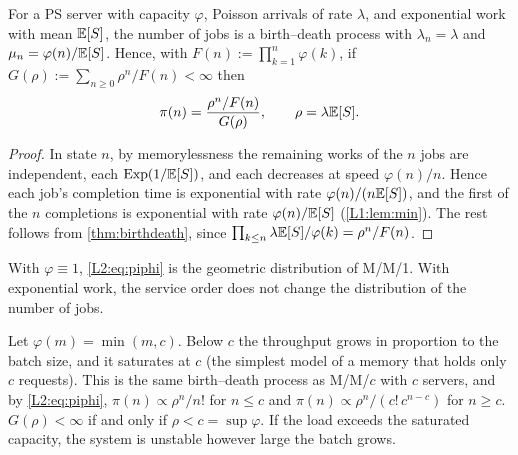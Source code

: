 
\begin{proposition}\label{prop:phi}
For a PS server with capacity $\varphi$, Poisson arrivals of rate $\lambda$, and
exponential work with mean $\mathbb{E}[S]$, the number of jobs is a birth--death process with
$\lambda_n=\lambda$ and $\mu_n=\varphi(n)/\mathbb{E}[S]$. Hence, with
$F(n):=\prod_{k=1}^n\varphi(k)$, if $G(\rho):=\sum_{n\ge0}\rho^n/F(n)<\infty$ then
\begin{equation}\label{L2:eq:piphi}
  \pi(n)=\frac{\rho^n/F(n)}{G(\rho)},\qquad \rho=\lambda\mathbb{E}[S].
\end{equation}
\end{proposition}
\begin{proof}
In state $n$, by memorylessness the remaining works of the $n$ jobs are independent,
each $\mathrm{Exp}(1/\mathbb{E}[S])$, and each decreases at speed $\varphi(n)/n$.
Hence each job's completion time is exponential with rate $\varphi(n)/(n\mathbb{E}[S])$, and the
first of the $n$ completions is exponential with rate $\varphi(n)/\mathbb{E}[S]$
(\cref{L1:lem:min}). The rest follows from \cref{thm:birthdeath}, since
$\prod_{k\le n}\lambda\mathbb{E}[S]/\varphi(k)=\rho^n/F(n)$.
\end{proof}

With $\varphi\equiv1$, \eqref{L2:eq:piphi} is the geometric distribution of M/M/1. With
exponential work, the service order does not change the distribution of the number of
jobs.

\begin{example}\label{L2:ex:sat}
Let $\varphi(m)=\min(m,c)$. Below $c$ the throughput grows in proportion to the batch
size, and it saturates at $c$ (the simplest model of a memory that holds only $c$
requests). This is the same birth--death process as M/M/$c$ with $c$ servers, and by
\eqref{L2:eq:piphi}, $\pi(n)\propto\rho^n/n!$ for $n\le c$ and
$\pi(n)\propto\rho^n/(c!\,c^{n-c})$ for $n\ge c$.
$G(\rho)<\infty$ if and only if $\rho<c=\sup\varphi$. If the load exceeds the saturated
capacity, the system is unstable however large the batch grows.
\end{example}

